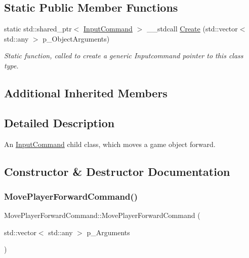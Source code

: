 \subsection*{Static Public Member Functions}
\begin{DoxyCompactItemize}
\item 
static std\+::shared\+\_\+ptr$<$ \mbox{\hyperlink{class_input_command}{Input\+Command}} $>$ \+\_\+\+\_\+stdcall \mbox{\hyperlink{class_move_player_forward_command_a3a4636b090b0cdd5c37df5285337eb2b}{Create}} (std\+::vector$<$ std\+::any $>$ p\+\_\+\+Object\+Arguments)
\begin{DoxyCompactList}\small\item\em Static function, called to create a generic Inputcommand pointer to this class type. \end{DoxyCompactList}\end{DoxyCompactItemize}
\subsection*{Additional Inherited Members}


\subsection{Detailed Description}
An \mbox{\hyperlink{class_input_command}{Input\+Command}} child class, which moves a game object forward. 

\subsection{Constructor \& Destructor Documentation}
\mbox{\label{class_move_player_forward_command_a80bf9bb58d10e2fe389244a0e94e4935}} 
\subsubsection{\texorpdfstring{MovePlayerForwardCommand()}{MovePlayerForwardCommand()}}
{\footnotesize\ttfamily Move\+Player\+Forward\+Command\+::\+Move\+Player\+Forward\+Command (\begin{DoxyParamCaption}\item[{std\+::vector$<$ std\+::any $>$}]{p\+\_\+\+Arguments }\end{DoxyParamCaption})\hspace{0.3cm}{\ttfamily [inline]}}



